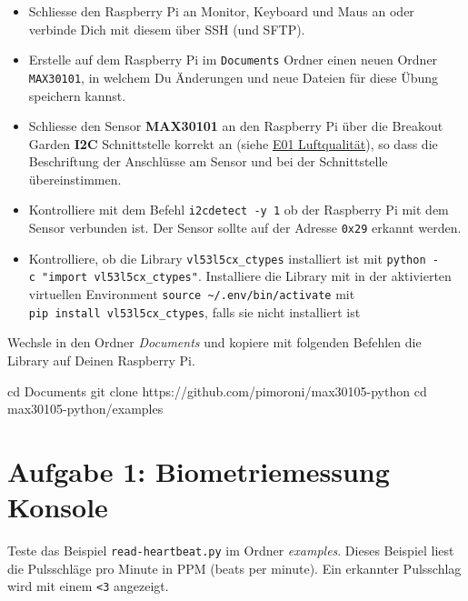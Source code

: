 \documentclass[
  11pt,
  a4paperpaper,
  oneside, openany  ,captions=tableheading
]{scrbook}
\newenvironment{Shaded}{\begin{snugshade}}{\end{snugshade}}
\newcommand{\BuiltInTok}[1]{\textcolor[rgb]{0.00,0.23,0.31}{#1}}
\newcommand{\FunctionTok}[1]{\textcolor[rgb]{0.28,0.35,0.67}{#1}}
\newcommand{\NormalTok}[1]{\textcolor[rgb]{0.00,0.23,0.31}{#1}}
\providecommand{\tightlist}{%
  \setlength{\itemsep}{0pt}\setlength{\parskip}{0pt}}
\theoremstyle{definition}
\theoremstyle{remark}
\begin{document}
\begin{itemize}
\tightlist
\item
  Schliesse den Raspberry Pi an Monitor, Keyboard und Maus an oder
  verbinde Dich mit diesem über SSH (und SFTP).
\item
  Erstelle auf dem Raspberry Pi im \texttt{Documents} Ordner einen neuen
  Ordner \texttt{MAX30101}, in welchem Du Änderungen und neue Dateien
  für diese Übung speichern kannst.
\item
  Schliesse den Sensor \textbf{MAX30101} an den Raspberry Pi über die
  Breakout Garden \textbf{I2C} Schnittstelle korrekt an (siehe
  \href{E01_Luftqualitaet.qmd}{E01 Luftqualität}), so dass die
  Beschriftung der Anschlüsse am Sensor und bei der Schnittstelle
  übereinstimmen.
\item
  Kontrolliere mit dem Befehl \texttt{i2cdetect\ -y\ 1} ob der Raspberry
  Pi mit dem Sensor verbunden ist. Der Sensor sollte auf der Adresse
  \texttt{0x29} erkannt werden.
\item
  Kontrolliere, ob die Library \texttt{vl53l5cx\_ctypes} installiert ist
  mit \texttt{python\ -c\ "import\ vl53l5cx\_ctypes"}. Installiere die
  Library mit in der aktivierten virtuellen Environment
  \texttt{source\ \textasciitilde{}/.env/bin/activate} mit
  \texttt{pip\ install\ vl53l5cx\_ctypes}, falls sie nicht installiert
  ist
\end{itemize}

Wechsle in den Ordner \emph{Documents} und kopiere mit folgenden
Befehlen die Library auf Deinen Raspberry Pi.

\begin{Shaded}
\begin{Highlighting}[]
\BuiltInTok{cd}\NormalTok{ Documents}
\FunctionTok{git}\NormalTok{ clone https://github.com/pimoroni/max30105{-}python}
\BuiltInTok{cd}\NormalTok{ max30105{-}python/examples}
\end{Highlighting}
\end{Shaded}

\section{Aufgabe 1: Biometriemessung
Konsole}\label{aufgabe-1-biometriemessung-konsole}

Teste das Beispiel \texttt{read-heartbeat.py} im Ordner \emph{examples}.
Dieses Beispiel liest die Pulsschläge pro Minute in PPM (beats per
minute). Ein erkannter Pulsschlag wird mit einem \texttt{\textless{}3}
angezeigt.
\end{document}
